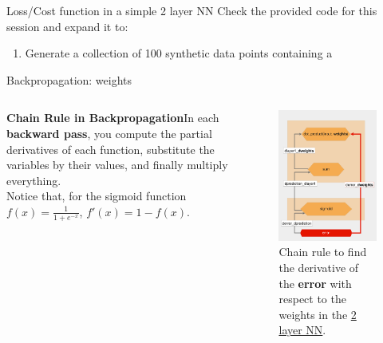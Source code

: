 \documentclass{beamer}
\begin{document}
\begin{frame}
    \begin{Exercise}{Loss/Cost function in a simple 2 layer NN}
        \label{Ex:2layer}
        Check the provided code for this session and expand it to:
        \begin{enumerate}
            \item Generate a collection of 100 synthetic data points containing a 
        \end{enumerate}
    \end{Exercise}
\end{frame}

\begin{frame}{Backpropagation: weights}
    \begin{columns}
        \begin{column}{0.6\linewidth}     
            {\bf Chain Rule in Backpropagation}In each {\bf backward pass}, you compute the partial derivatives of each function, substitute the variables by their values, and finally multiply everything.
            \\[10pt]
            Notice that, for the sigmoid function $f(x)=\frac{1}{1+e^{-x}}$, $f'(x)=1-f(x)$.
        \end{column}
        \begin{column}{0.4\linewidth}
            \begin{figure}
                \includegraphics[width=0.7\linewidth]{WeightGradient.png}
                \caption{Chain rule to find the derivative of the {\bf error} with respect to the weights in the \href{https://realpython.com/python-ai-neural-network/}{2 layer NN}.}
                \label{Fig:Training2Layer}
            \end{figure}
        \end{column}
     \end{columns}
\end{frame}
\end{document}
